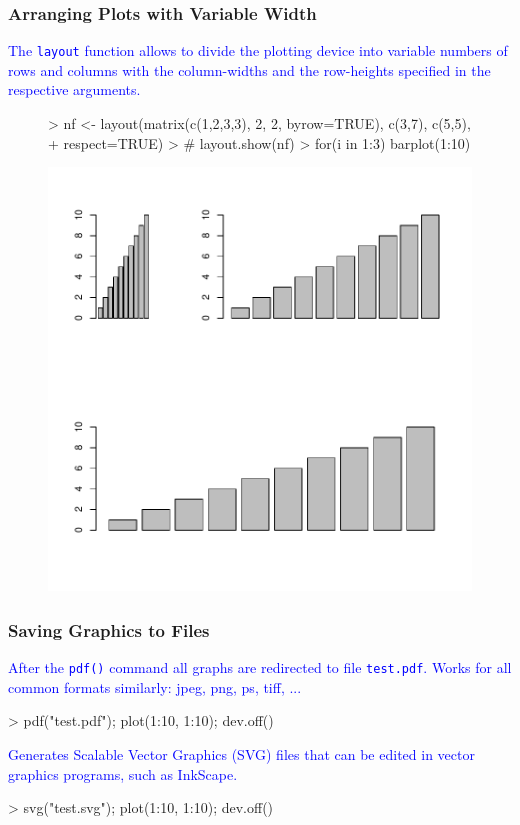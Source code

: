 \documentclass{beamer}
\newcommand{\Rfunction}[1]{{\texttt{#1}}}
\begin{document}
\begin{frame}[containsverbatim]  
	\frametitle{Arranging Plots with Variable Width}
\scriptsize
\textcolor{blue}{The \Rfunction{layout} function allows to divide the plotting device into variable numbers of rows and columns with the column-widths and the row-heights specified in the respective arguments.}
\begin{figure}
  \centering
\begin{Schunk}
\begin{Sinput}
> nf <- layout(matrix(c(1,2,3,3), 2, 2, byrow=TRUE), c(3,7), c(5,5), 
+              respect=TRUE)
> # layout.show(nf)
> for(i in 1:3) { barplot(1:10) } 
\end{Sinput}
\end{Schunk}
\includegraphics{fig--024}
\label{fig:arrange2}
\end{figure}
\end{frame}
\begin{frame}[containsverbatim]  
	\frametitle{Saving Graphics to Files}
\scriptsize
\textcolor{blue}{After the \Rfunction{pdf()} command all graphs are redirected to file \Rfunction{test.pdf}. Works for all common formats similarly: jpeg, png, ps, tiff, ...}
\begin{Schunk}
\begin{Sinput}
> pdf("test.pdf"); plot(1:10, 1:10); dev.off() 
\end{Sinput}
\end{Schunk}
\textcolor{blue}{Generates Scalable Vector Graphics (SVG) files that can be edited in vector graphics programs, such as InkScape.}
\begin{Schunk}
\begin{Sinput}
> svg("test.svg"); plot(1:10, 1:10); dev.off() 
\end{Sinput}
\end{Schunk}
\end{frame}
\end{document}
